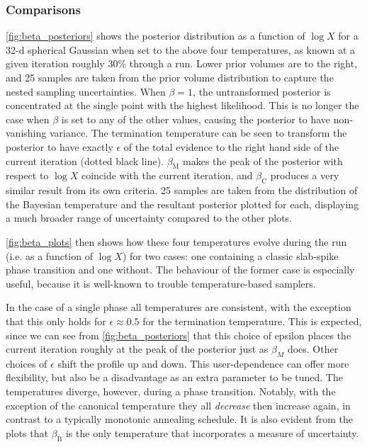 \documentclass[usenatbib]{mnras}
\begin{document}
\subsubsection*{Comparisons}
\cref{fig:beta_posteriors} shows the posterior distribution as a function of $\log X$ for a 32-d spherical Gaussian when set to the above four temperatures, as known at a given iteration roughly 30\% through a run. Lower prior volumes are to the right, and 25 samples are taken from the prior volume distribution to capture the nested sampling uncertainties. When $\beta = 1$, the untransformed posterior is concentrated at the single point with the highest likelihood. This is no longer the case when $\beta$ is set to any of the other values, causing the posterior to have non-vanishing variance. The termination temperature can be seen to transform the posterior to have exactly $\epsilon$ of the total evidence to the right hand side of the current iteration (dotted black line). $\beta_\mathrm{M}$ makes the peak of the posterior with respect to $\log X$ coincide with the current iteration, and $\beta_\mathrm{C}$ produces a very similar result from its own criteria. 25 samples are taken from the distribution of the Bayesian temperature and the resultant posterior plotted for each, displaying a much broader range of uncertainty compared to the other plots.
\par
\cref{fig:beta_plots} then shows how these four temperatures evolve during the run (i.e. as a function of $\log X$) for two cases: one containing a classic slab-spike phase transition and one without. The behaviour of the former case is especially useful, because it is well-known to trouble temperature-based samplers. 
\par
In the case of a single phase all temperatures are consistent, with the exception that this only holds for $\epsilon \approx 0.5$ for the termination temperature. This is expected, since we can see from \cref{fig:beta_posteriors} that this choice of epsilon places the current iteration roughly at the peak of the posterior just as $\beta_M$ does. Other choices of $\epsilon$ shift the profile up and down. This user-dependence can offer more flexibility, but also be a disadvantage as an extra parameter to be tuned. The temperatures diverge, however, during a phase transition. Notably, with the exception of the canonical temperature they all \textit{decrease} then increase again, in contrast to a typically monotonic annealing schedule. It is also evident from the plots that $\beta_\mathrm{B}$ is the only temperature that incorporates a measure of uncertainty.
\end{document}
